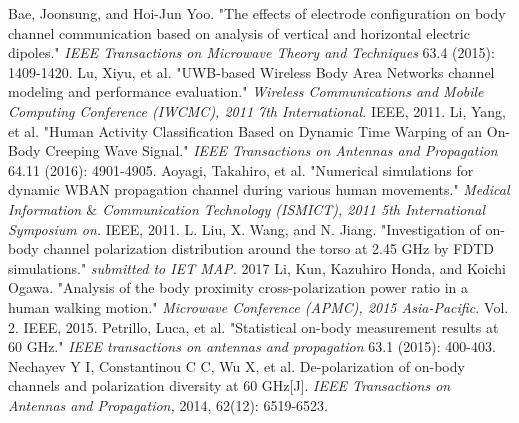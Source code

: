 \documentclass[conference]{IEEEtran}
\begin{document}
\begin{thebibliography}{1}

Bae, Joonsung, and Hoi-Jun Yoo. "The effects of electrode configuration on body channel communication based on analysis of vertical and horizontal electric dipoles." \emph{IEEE Transactions on Microwave Theory and Techniques} 63.4 (2015): 1409-1420.
Lu, Xiyu, et al. "UWB-based Wireless Body Area Networks channel modeling and performance evaluation." \emph{Wireless Communications and Mobile Computing Conference (IWCMC), 2011 7th International.} IEEE, 2011.
Li, Yang, et al. "Human Activity Classification Based on Dynamic Time Warping of an On-Body Creeping Wave Signal." \emph{IEEE Transactions on Antennas and Propagation} 64.11 (2016): 4901-4905.
Aoyagi, Takahiro, et al. "Numerical simulations for dynamic WBAN propagation channel during various human movements." \emph{Medical Information $\&$ Communication Technology (ISMICT), 2011 5th International Symposium on.} IEEE, 2011.
L. Liu, X. Wang, and N. Jiang. "Investigation of on-body channel polarization distribution around the torso at 2.45 GHz by FDTD simulations." \emph{submitted to IET MAP.} 2017
Li, Kun, Kazuhiro Honda, and Koichi Ogawa. "Analysis of the body proximity cross-polarization power ratio in a human walking motion." \emph{Microwave Conference (APMC), 2015 Asia-Pacific.} Vol. 2. IEEE, 2015.
Petrillo, Luca, et al. "Statistical on-body measurement results at 60 GHz." \emph{IEEE transactions on antennas and propagation} 63.1 (2015): 400-403.
Nechayev Y I, Constantinou C C, Wu X, et al. De-polarization of on-body channels and polarization diversity at 60 GHz[J]. \emph{IEEE Transactions on Antennas and Propagation,} 2014, 62(12): 6519-6523.
\end{thebibliography}




\end{document}
